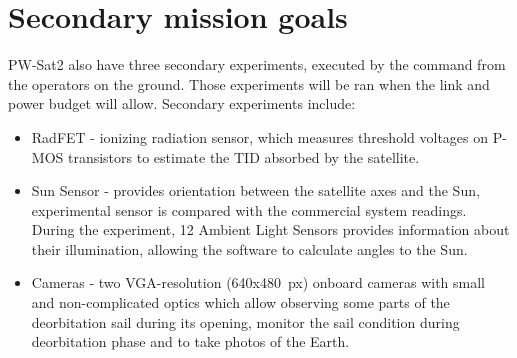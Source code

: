 \section{Secondary mission goals}
PW-Sat2 also have three secondary experiments, executed by the command from the operators on the ground. Those experiments will be ran when the link and power budget will allow. Secondary experiments include:
\begin{itemize}
    \item RadFET - ionizing radiation sensor, which measures threshold voltages on P-MOS transistors to estimate the TID absorbed by the satellite.
    \item Sun Sensor -  provides orientation between the satellite axes and the Sun, experimental sensor is compared with the commercial system readings. During the experiment, \si{12} Ambient Light Sensors provides information about their illumination, allowing the software to calculate angles to the Sun.
    \item Cameras - two VGA-resolution (\si{640}x\si{480}~px) onboard cameras with small and non-complicated optics which allow observing some parts of the deorbitation sail during its opening, monitor the sail condition during deorbitation phase and to take photos of the Earth.
\end{itemize}



